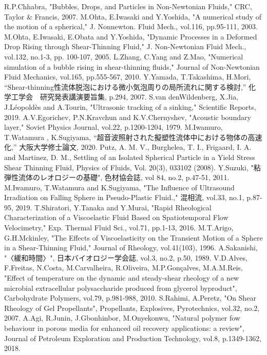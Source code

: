\begin{thebibliography}{99}
     R.P.Chhabra, "Bubbles, Drops, and Particles in Non-Newtonian Fluids," CRC, Taylor \& Francis, 2007.
     M.Ohta, E.Iwasaki and Y.Yoshida, "A numerical study of the motion of a spherical," J. Nonnewton. Fluid Mech., vol.116, pp.95-111, 2003.
     M.Ohta, E.Iwasaki, E.Obata and Y.Yoshida, "Dynamic Processes in a Deformed Drop Rising through Shear-Thinning Fluid," J. Non-Newtonian Fluid Mech., vol.132, no.1-3, pp. 100-107, 2005.
     L.Zhang, C.Yang and Z.Mao, "Numerical simulation of a bubble rising in shear-thinning fluids," Journal of Non-Newtonian Fluid Mechanics, vol.165, pp.555-567, 2010.
     Y.Yamada, T.Takashima, H.Mori, “Shear-thinning性流体脱泡における微小気泡周りの局所流れに関する検討,” 化学工学会　研究発表講演要旨集, p.294, 2007.
     S.van denWildenberg, X.Jia, J.Léopoldès and A.Tourin, "Ultrasonic tracking of a sinking," Scientific Reports, 2019.
     A.V.Egorichev, P.N.Kravchun and K.V.Chernyshev, "Acoustic boundary layer," Soviet Physics Journal, vol.22, p.1200-1204, 1979.
     M.Iwamuro, T.Watamura , K.Sugiyama, “超音波照射された擬塑性流体中における物体の高速化,” 大阪大学修士論文, 2020.
     Putz, A. M. V., Burghelea, T. I., Frigaard, I. A. and Martinez, D. M., Settling of an Isolated Spherical Particle in a Yield Stress Shear Thinning Fluid, Physics of Fluids, Vol. 20(3), 033102 (2008).
     Y.Suzuki, "粘弾性流体のレオロジーの基礎", 色材協会誌, vol 84, no.2, p.47-51, 2011.
     M.Iwamuro, T.Watamura and K.Sugiyama, "The Influence of Ultrasound Irradiation on Falling Sphere in Pseudo-Plastic Fluid.," 混相流, vol.33, no.1, p.87-95, 2019.
     T.Shiratori, Y.Tanaka and Y.Murai, "Rapid Rheological Characterization of a Viscoelastic Fluid Based on Spatiotemporal Flow Velocimetry," Exp. Thermal Fluid Sci., vol.71, pp.1-13, 2016.
     M.T.Arigo, G.H.Mckinley, "The Effects of Viscoelasticity on the Transient Motion of a Sphere in a Shear-Thinning Fluid," Journal of Rheology, vol.41(103), 1996.
     A.Sakanishi, "〈緩和時間〉", 日本バイオロジー学会誌, vol.3, no.2, p.50, 1989.
     V.D.Alves, F.Freitas, N.Costa, M.Carvalheira, R.Oliveira, M.P.Gonçalves, M.A.M.Reis, "Effect of temperature on the dynamic and steady-shear rheology of a new microbial extracellular polysaccharide produced from glycerol byproduct", Carbohydrate Polymers, vol.79, p.981-988, 2010.
     S.Rahimi, A.Peretz, "On Shear Rheology of Gel Propellants", Propellants, Explosives, Pyrotechnics, vol.32, no.2, 2007.
     A.Agi, R.Junin, J.Gbonhinbor, M.Onyekonwu, "Natural polymer fow behaviour in porous media for enhanced oil recovery applications: a review", Journal of Petroleum Exploration and Production Technology, vol.8, p.1349-1362, 2018.
\end{thebibliography}